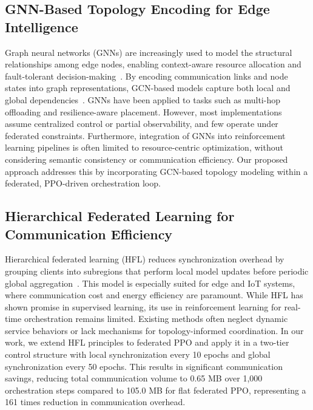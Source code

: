 \subsection{GNN-Based Topology Encoding for Edge Intelligence}

Graph neural networks (GNNs) are increasingly used to model the structural relationships among edge nodes, enabling context-aware resource allocation and fault-tolerant decision-making~\cite{Kumar2023_GNNOrchestration,Chen2024_GNNTopologyEdge}. By encoding communication links and node states into graph representations, GCN-based models capture both local and global dependencies~\cite{Zhang2023_GNNResourceAlloc,Liang2024_TopoGNN}. GNNs have been applied to tasks such as multi-hop offloading and resilience-aware placement. However, most implementations assume centralized control or partial observability, and few operate under federated constraints. Furthermore, integration of GNNs into reinforcement learning pipelines is often limited to resource-centric optimization, without considering semantic consistency or communication efficiency. Our proposed approach addresses this by incorporating GCN-based topology modeling within a federated, PPO-driven orchestration loop.

\subsection{Hierarchical Federated Learning for Communication Efficiency}

Hierarchical federated learning (HFL) reduces synchronization overhead by grouping clients into subregions that perform local model updates before periodic global aggregation~\cite{Liu2023_HierFL,Zhao2023_HFLIoT,Tang2024_HFLV2X}. This model is especially suited for edge and IoT systems, where communication cost and energy efficiency are paramount. While HFL has shown promise in supervised learning, its use in reinforcement learning for real-time orchestration remains limited. Existing methods often neglect dynamic service behaviors or lack mechanisms for topology-informed coordination. In our work, we extend HFL principles to federated PPO and apply it in a two-tier control structure with local synchronization every 10 epochs and global synchronization every 50 epochs. This results in significant communication savings, reducing total communication volume to 0.65 MB over 1,000 orchestration steps compared to 105.0 MB for flat federated PPO, representing a 161 times reduction in communication overhead.



